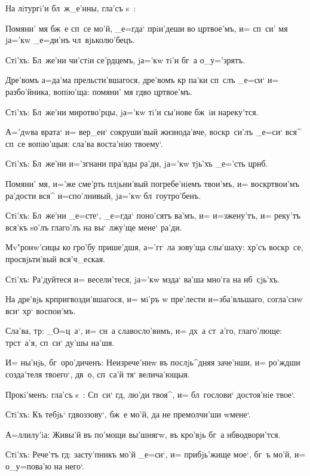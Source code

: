 На лiтургi'и бл~ж_е'нны, гла'съ s~:

Помяни' мя бж~е сп~се мо'й, _е=гда` прiи'деши во 
цр твое'мъ, и= сп~си' мя jа='кw _е=ди'нъ 
чл~вjьколю'бецъ. 

Стi'хъ: Бл~же'ни чи'стiи се'рдцемъ, jа='кw тi'и бг~а 
о_у='зрятъ. 

Дре'вомъ а=да'ма прельсти'вшагося, дре'вомъ кр 
па'ки сп~слъ _е=си` и= разбо'йника, вопiю'ща: помяни' мя 
гд во цр твое'мъ.

Стi'хъ: Бл~же'ни миротво'рцы, jа='кw тi'и сы'нове 
бж~iи нареку'тся. 

А='дwва врата` и= вер_еи` сокруши'вый жизнода'вче, 
воскр~си'лъ _е=си` вся^ сп~се вопiю'щыя: сла'ва воста'нiю 
твоему`. 

Стi'хъ: Бл~же'ни и='згнани пра'вды ра'ди, jа='кw 
тjь'хъ _е='сть цр нб. 

Помяни' мя, и='же сме'рть плjьни'вый погребе'нiемъ 
твои'мъ, и= воскр твои'мъ ра'дости вся^ 
и=спо'лнивый, jа='кw бл~гоутро'бенъ.

Стi'хъ: Бл~же'ни _е=сте`, _е=гда` поно'сятъ ва'мъ, и= 
и=зжену'тъ, и= реку'тъ вся'къ sо'лъ глаго'лъ на вы` 
лжу'ще мене` ра'ди.

Мv"ронw'сицы ко гро'бу прише'дшя, а='гг~ла зову'ща 
слы'шаху: хр'съ воскр~се, просвjьти'вый вся'ч_еская.

Стi'хъ: Ра'дуйтеся и= весели'теся, jа='кw мзда` ва'ша 
мно'га на нб~сjь'хъ.

На дре'вjь кр пригвозди'вшагося, и= мi'ръ w\т 
пре'лести и=зба'вльшаго, согла'снw вси` хр` 
воспои'мъ. 

Сла'ва, тр: _О=ц~а`, и= сн~а славосло'вимъ, и= 
дх~а ст~а'го, глаго'люще: тр ст~а'я, сп~си` ду'шы 
на'шя.

И= ны'нjь, бг~оро'диченъ: Неизрече'ннw въ послjь^дняя 
заче'нши, и= ро'ждши созда'теля твоего`, дв~о, сп~са'й 
тя` велича'ющыя.

Прокi'менъ: гла'съ s~: Сп~си` гд, лю'ди твоя^, и= 
бл~гослови` достоя'нiе твое`.

Стi'хъ: Къ тебjь` гд воззову`, бж~е мо'й, да не 
премолчи'ши w\т мене`.

А=ллилу'iа: Живы'й въ по'мощи вы'шнягw, въ кро'вjь 
бг~а нб водвори'тся.

Стi'хъ: Рече'тъ гд: засту'пникъ мо'й _е=си`, и= 
прибjь'жище мое`, бг~ъ мо'й, и= о_у=пова'ю на него`.


